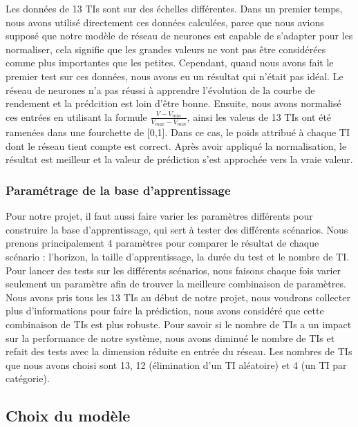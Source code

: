 Les données de 13 TIs sont sur des échelles différentes. Dans un premier temps, nous avons utilisé directement ces données calculées, parce que nous avions supposé que notre modèle de réseau de neurones est capable de s'adapter pour les normaliser, cela signifie que les grandes valeurs ne vont pas être considérées comme plus importantes que les petites. Cependant, quand nous avons fait le premier test sur ces données, nous avons eu un résultat qui n’était pas idéal. Le réseau de neurones n'a pas réussi à apprendre l'évolution de la courbe de rendement et la prédcition est loin d'être bonne. Ensuite, nous avons normalisé ces entrées en utilisant la formule $\frac{V-V_{min}}{V_{max}-V_{min}}$, ainsi les valeus de 13 TIs ont été ramenées dans une fourchette de [0,1]. Dans ce cas, le poids attribué à chaque TI dont le réseau tient compte est correct. Après avoir appliqué la normalisation, le résultat est meilleur et la valeur de prédiction s'est approchée vers la vraie valeur.

\subsubsection{Paramétrage de la base d'apprentissage}

Pour notre projet, il faut aussi faire varier les paramètres différents pour construire la base d'apprentissage, qui sert à tester des différents scénarios. Nous prenons principalement 4 paramètres pour comparer le résultat de chaque scénario : l'horizon, la taille d'apprentissage, la durée du test et le nombre de TI. Pour lancer des tests sur les différents scénarios, nous faisons chaque fois varier seulement un paramètre afin de trouver la meilleure combinaison de paramètres.\\

Nous avons pris tous les 13 TIs au début de notre projet, nous voudrons collecter plus d’informations pour faire la prédiction, nous avons considéré que cette combinaison de TIs est plus robuste. Pour savoir si le nombre de TIs a un impact sur la performance de notre système, nous avons diminué le nombre de TIs et refait des tests avec la dimension réduite en entrée du réseau. Les nombres de TIs que nous avons choisi sont 13, 12 (élimination d'un TI aléatoire) et 4 (un TI par catégorie).

   	
\subsection{Choix du modèle}

